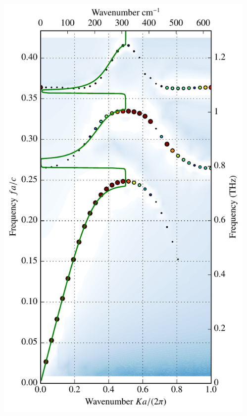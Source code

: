 \documentclass[t]{beamer} \usepackage[english]{babel} \usepackage[utf8]{inputenc} \usetheme{Frankfurt} %
\begin{document}
\begin{frame}[plain]{}
\begin{columns}[T]
\begin{column}{.55\textwidth}
	\end{column}%
	\begin{column}{.45\textwidth}
		\vspace{-1mm}\includegraphics[height=\paperheight]{../img-cdh-new/CDH_SRRArray_06.pdf} 
	\end{column}
\end{columns}
\end{frame} 		%
\end{document}
